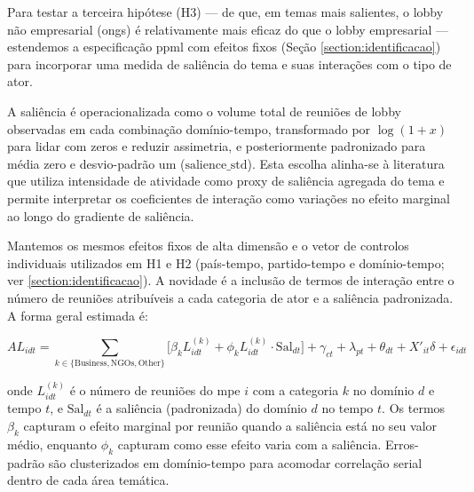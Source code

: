 Para testar a terceira hipótese (H3) — de que, em temas mais salientes, o lobby não empresarial (\acrshort{ong}s) é relativamente mais eficaz do que o lobby empresarial — estendemos a especificação \acrshort{ppml} com efeitos fixos (Seção \ref{section:identificacao}) para incorporar uma medida de saliência do tema e suas interações com o tipo de ator.

A saliência é operacionalizada como o volume total de reuniões de lobby observadas em cada combinação domínio-tempo, transformado por \(\log(1+x)\) para lidar com zeros e reduzir assimetria, e posteriormente padronizado para média zero e desvio-padrão um (\(\text{salience\_std}\)). Esta escolha alinha-se à literatura que utiliza intensidade de atividade como proxy de saliência agregada do tema e permite interpretar os coeficientes de interação como variações no efeito marginal ao longo do gradiente de saliência.

Mantemos os mesmos efeitos fixos de alta dimensão e o vetor de controlos individuais utilizados em H1 e H2 (país-tempo, partido-tempo e domínio-tempo; ver \ref{section:identificacao}). A novidade é a inclusão de termos de interação entre o número de reuniões atribuíveis a cada categoria de ator e a saliência padronizada. A forma geral estimada é:

\begin{equation}
    \label{eq:modelo_h3}
    AL_{idt} = \sum_{k \in \{\text{Business},\text{NGOs},\text{Other}\}} \Big[ \beta_k L_{idt}^{(k)} + \phi_k L_{idt}^{(k)} \cdot \text{Sal}_{dt} \Big] + \gamma_{ct} + \lambda_{pt} + \theta_{dt} + X'_{it}\delta + \epsilon_{idt}
\end{equation}

onde \(L_{idt}^{(k)}\) é o número de reuniões do \acrshort{mpe} \(i\) com a categoria \(k\) no domínio \(d\) e tempo \(t\), e \(\text{Sal}_{dt}\) é a saliência (padronizada) do domínio \(d\) no tempo \(t\). Os termos \(\beta_k\) capturam o efeito marginal por reunião quando a saliência está no seu valor médio, enquanto \(\phi_k\) capturam como esse efeito varia com a saliência. Erros-padrão são clusterizados em domínio-tempo para acomodar correlação serial dentro de cada área temática.

